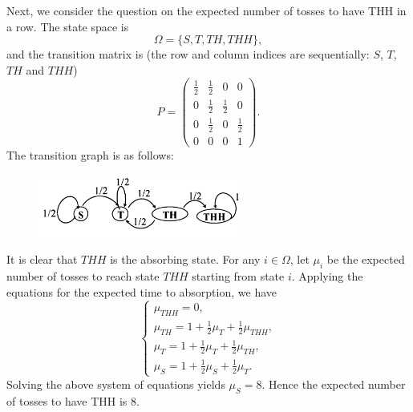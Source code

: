\documentclass[12pt,letterpaper, onecolumn]{exam}
\begin{document}
\begin{questions}
\begin{solution}
\begin{parts}
                \quad Next, we consider the question on the expected number of tosses to have THH in a row. The state space is 
                $$\Omega=\{S,T,TH,THH\},$$
                and the transition matrix is (the row and column indices are sequentially: $S$, $T$, $TH$ and $THH$)
                $$P=\begin{pmatrix}
                    \frac{1}{2}&\frac{1}{2}&0&0\\
                    0&\frac{1}{2}&\frac{1}{2}&0\\
                    0&\frac{1}{2}&0&\frac{1}{2}\\
                    0&0&0&1
                \end{pmatrix}.$$
             The transition graph is as follows:
             \begin{figure}[H]
                \centering
                \includegraphics[width=0.6\textwidth]{figures/fig-6.png}
            \end{figure}
            \quad It is clear that $THH$ is the absorbing state. For any $i\in\Omega$, let $\mu_i$ be the expected number of tosses to reach state $THH$ starting from state $i$. Applying the equations for the expected time to absorption, we have 
            \begin{equation*}
                \begin{cases}
                    \mu_{THH}=0,\\
                    \mu_{TH}=1+\frac{1}{2}\mu_{T}+\frac{1}{2}\mu_{THH},\\
                    \mu_{T}=1+\frac{1}{2}\mu_{T}+\frac{1}{2}\mu_{TH},\\
                    \mu_{S}=1+\frac{1}{2}\mu_{S}+\frac{1}{2}\mu_{T}.
                \end{cases}
            \end{equation*}
            Solving the above system of equations yields $\mu_S=8$. Hence the expected number of tosses to have THH is $8$.

\end{parts}
\end{solution}
\end{questions}
\end{document}
